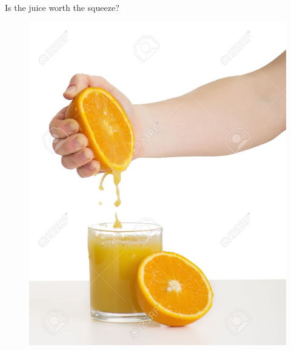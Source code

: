 \documentclass[10pt]{beamer}\usepackage[]{graphicx}\usepackage[]{color}
\begin{document}
\begin{frame}{Is the juice worth the squeeze?}
\begin{figure}[h!]
\centering
\includegraphics[scale=0.40, keepaspectratio]{./juice}
\end{figure}
\end{frame}
\end{document}
